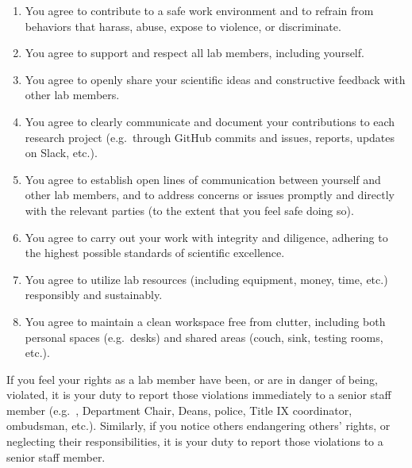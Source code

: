 \documentclass{tufte-book} %
\begin{document}
\begin{enumerate}
  \item You agree to contribute to a safe work environment and to refrain
    from behaviors that harass, abuse, expose to violence, or
    discriminate.
  \item You agree to support and respect all lab members, including
    yourself.
  \item You agree to openly share your scientific ideas and constructive
    feedback with other lab members.
  \item You agree to clearly communicate and document your
    contributions to each research project (e.g.\ through GitHub
    commits and issues, reports, updates on Slack, etc.).
  \item You agree to establish open lines of communication between
    yourself and other lab members, and to address concerns or issues promptly and
    directly with the relevant parties (to the extent that you feel
    safe doing so).
  \item You agree to carry out your work with integrity and diligence,
    adhering to the highest possible standards of scientific
    excellence.
  \item You agree to utilize lab resources (including equipment,
    money, time, etc.) responsibly and sustainably.
  \item You agree to maintain a clean workspace free from clutter,
    including both personal spaces (e.g.\  desks) and shared
    areas (couch, sink, testing rooms, etc.).
\end{enumerate}


\noindent If you feel your rights as a lab member have been, or are in danger of
being, violated, it is your duty to report those violations immediately to a
senior staff member (e.g.\ \director, Department Chair, Deans, police,
Title IX coordinator, ombudsman, etc.).  Similarly, if you notice
others endangering others' rights, or neglecting their
responsibilities, it is your duty to report those violations to a
senior staff member.
\end{document}
